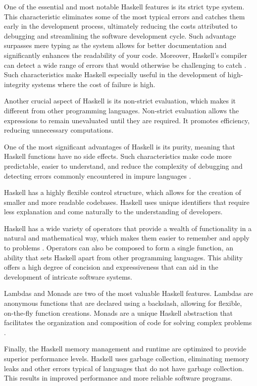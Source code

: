 \documentclass[a4paper, titlepage, twoside]{article}
\begin{document}
One of the essential and most notable Haskell features is its strict type system. This characteristic eliminates some of the most typical errors and catches them early in the development process, ultimately reducing the costs attributed to debugging and streamlining the software development cycle. Such advantage surpasses mere typing as the system allows for better documentation and significantly enhances the readability of your code. Moreover, Haskell's compiler can detect a wide range of errors that would otherwise be challenging to catch \autocite{huttonProgrammingHaskell2007}. Such characteristics make Haskell especially useful in the development of high-integrity systems where the cost of failure is high.

Another crucial aspect of Haskell is its non-strict evaluation, which makes it different from other programming languages. Non-strict evaluation allows the expressions to remain unevaluated until they are required. It promotes efficiency, reducing unnecessary computations.

One of the most significant advantages of Haskell is its purity, meaning that Haskell functions have no side effects. Such characteristics make code more predictable, easier to understand, and reduce the complexity of debugging and detecting errors commonly encountered in impure languages \autocite{huttonProgrammingHaskell2007}.

Haskell has a highly flexible control structure, which allows for the creation of smaller and more readable codebases. Haskell uses unique identifiers that require less explanation and come naturally to the understanding of developers.

Haskell has a wide variety of operators that provide a wealth of functionality in a natural and mathematical way, which makes them easier to remember and apply to problems \autocite{huttonProgrammingHaskell2007}. Operators can also be composed to form a single function, an ability that sets Haskell apart from other programming languages. This ability offers a high degree of concision and expressiveness that can aid in the development of intricate software systems.

Lambdas and Monads are two of the most valuable Haskell features. Lambdas are anonymous functions that are declared using a backslash, allowing for flexible, on-the-fly function creations. Monads are a unique Haskell abstraction that facilitates the organization and composition of code for solving complex problems \autocite{marlowParallelConcurrentProgramming2013}.

Finally, the Haskell memory management and runtime are optimized to provide superior performance levels. Haskell uses garbage collection, eliminating memory leaks and other errors typical of languages that do not have garbage collection. This results in improved performance and more reliable software programs.

\printbibliography
\end{document}
